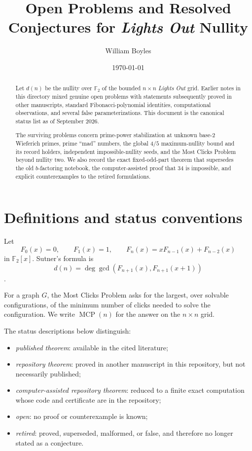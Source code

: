 \documentclass[a4paper]{article}
\newcommand{\F}{\mathbb{F}}
\DeclareMathOperator{\MCP}{MCP}
\begin{document}
\title{Open Problems and Resolved Conjectures for \textit{Lights Out} Nullity}
\author{William Boyles}
\date{\today}
\maketitle

\begin{abstract}
	Let $d(n)$ be the nullity over $\F_2$ of the bounded $n\times n$
	\textit{Lights Out} grid.  Earlier notes in this directory mixed genuine
	open problems with statements subsequently proved in other manuscripts,
	standard Fibonacci-polynomial identities, computational observations,
	and several false parameterizations.  This document is the canonical
	status list as of September 2026.

	The surviving problems concern prime-power stabilization at unknown
	base-$2$ Wieferich primes, prime ``mad'' numbers, the global
	$4/5$ maximum-nullity bound and its record holders, independent
	impossible-nullity seeds, and the Most Clicks Problem beyond nullity two.
	We also record the exact fixed-odd-part theorem that supersedes the old
	$b$-factoring notebook, the computer-assisted proof that $34$ is
	impossible, and explicit counterexamples to the retired formulations.
\end{abstract}

\tableofcontents

\section{Definitions and status conventions}

Let
\[
	F_0(x)=0,\qquad F_1(x)=1,\qquad
	F_n(x)=xF_{n-1}(x)+F_{n-2}(x)
\]
in $\F_2[x]$.  Sutner's formula is
\begin{equation}\label{eq:sutner}
	d(n)=\deg\gcd\!\left(F_{n+1}(x),F_{n+1}(x+1)\right)
\end{equation}
\cite{Sutner2000}.

For a graph $G$, the Most Clicks Problem asks for the largest, over solvable
configurations, of the minimum number of clicks needed to solve the
configuration.  We write $\MCP(n)$ for the answer on the $n\times n$ grid.

The status descriptions below distinguish:
\begin{itemize}
	\item \emph{published theorem}: available in the cited literature;
	\item \emph{repository theorem}: proved in another manuscript in this
	      repository, but not necessarily published;
	\item \emph{computer-assisted repository theorem}: reduced to a finite
	      exact computation whose code and certificate are in the repository;
	\item \emph{open}: no proof or counterexample is known;
	\item \emph{retired}: proved, superseded, malformed, or false, and
	      therefore no longer stated as a conjecture.
\end{itemize}
\end{document}
